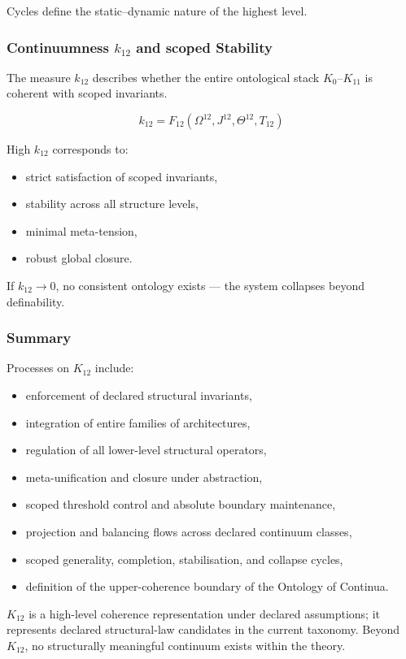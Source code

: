 Cycles define the static--dynamic nature of the highest level.

\subsubsection{Continuumness $k_{12}$ and scoped Stability}

The measure $k_{12}$ describes whether
the entire ontological stack $K_0$--$K_{11}$ 
is coherent with scoped invariants.

\[
k_{12} = F_{12}(\Omega^{12}, J^{12}, \Theta^{12}, T_{12})
\]

High $k_{12}$ corresponds to:
\begin{itemize}
    \item strict satisfaction of scoped invariants,
    \item stability across all structure levels,
    \item minimal meta-tension,
    \item robust global closure.
\end{itemize}

If $k_{12} \to 0$,  
no consistent ontology exists --- the system collapses beyond definability.

\subsubsection{Summary}

Processes on $K_{12}$ include:
\begin{itemize}
    \item enforcement of declared structural invariants,
    \item integration of entire families of architectures,
    \item regulation of all lower-level structural operators,
    \item meta-unification and closure under abstraction,
    \item scoped threshold control and absolute boundary maintenance,
    \item projection and balancing flows across declared continuum classes,
    \item scoped generality, completion, stabilisation, and collapse cycles,
    \item definition of the upper-coherence boundary of the Ontology of Continua.
\end{itemize}

$K_{12}$ is a high-level coherence representation under declared assumptions; it represents declared structural-law candidates in the current taxonomy.  
Beyond $K_{12}$, no structurally meaningful continuum exists within the theory.
